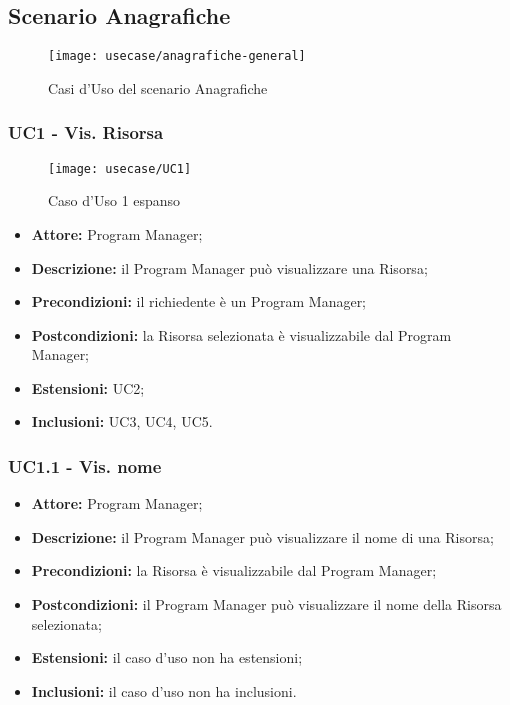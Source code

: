 \subsection{Scenario Anagrafiche}
\begin{figure}[H] 
    \centering 
    \texttt{[image: usecase/anagrafiche-general]} 
    \caption{Casi d'Uso del scenario Anagrafiche}
\end{figure}

\subsubsection*{UC1 - Vis. Risorsa}

\begin{figure}[H] 
    \centering 
    \texttt{[image: usecase/UC1]} 
    \caption{Caso d'Uso 1 espanso}
\end{figure}

\begin{itemize}[label=$\circ$]
\item \textbf{Attore:} Program Manager;
\item \textbf{Descrizione:} il Program Manager può visualizzare una Risorsa;
\item \textbf{Precondizioni:} il richiedente è un Program Manager;
\item \textbf{Postcondizioni:} la Risorsa selezionata è visualizzabile dal Program Manager;
\item \textbf{Estensioni:} UC2;
\item \textbf{Inclusioni:} UC3, UC4, UC5.
\end{itemize}

\subsubsection*{UC1.1 - Vis. nome}
\begin{itemize}[label=$\circ$]
\item \textbf{Attore:} Program Manager;
\item \textbf{Descrizione:} il Program Manager può visualizzare il nome di una Risorsa;
\item \textbf{Precondizioni:} la Risorsa è visualizzabile dal Program Manager;
\item \textbf{Postcondizioni:} il Program Manager può visualizzare il nome della Risorsa selezionata;
\item \textbf{Estensioni:} il caso d'uso non ha estensioni;
\item \textbf{Inclusioni:} il caso d'uso non ha inclusioni.
\end{itemize}

